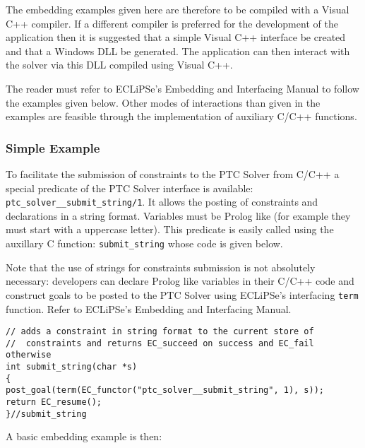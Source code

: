 \documentclass{article}
\begin{document}
The embedding examples given here are therefore to be compiled with a Visual C++
compiler. If a different compiler is preferred for the development of the
application then it is suggested that a simple Visual C++ interface be created
and
that a Windows DLL be generated. The application can then interact with the
solver via this DLL compiled using Visual C++.

The reader must refer to ECLiPSe's Embedding and Interfacing Manual to follow the
examples
given below. Other modes of interactions than given in the examples are feasible
through the implementation of auxiliary C/C++ functions.

\subsubsection{Simple Example}

To facilitate the submission of constraints to the PTC Solver from C/C++ a
special predicate of the PTC Solver interface is available:
\verb+ptc_solver__submit_string/1+. It allows the posting of constraints and
declarations in a string format. Variables must be Prolog like (for example they
must start with a uppercase letter). This predicate is easily called using the
auxillary C function: \verb+submit_string+ whose code is given below.

Note
that the use of strings for constraints submission is not absolutely necessary:
developers can declare Prolog like variables in their C/C++ code and construct
goals to be posted to the PTC Solver using ECLiPSe's interfacing \verb+term+
function. Refer to ECLiPSe's Embedding and Interfacing Manual.

\begin{verbatim}
// adds a constraint in string format to the current store of
//  constraints and returns EC_succeed on success and EC_fail otherwise
int submit_string(char *s)
{
post_goal(term(EC_functor("ptc_solver__submit_string", 1), s));
return EC_resume();
}//submit_string
\end{verbatim}

A basic embedding example is then:
\end{document}
